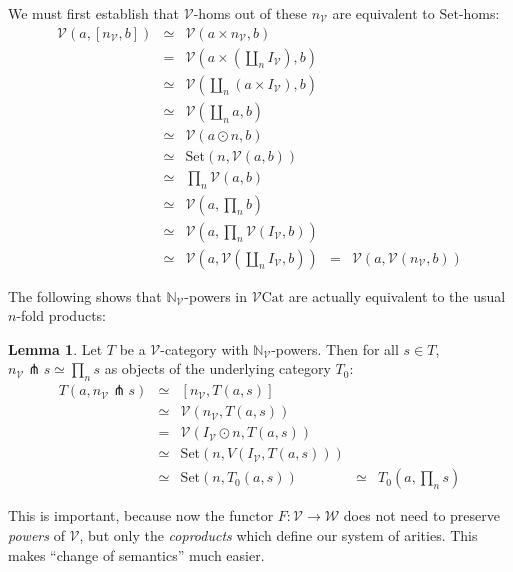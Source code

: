 \documentclass[a4paper,UKenglish]{article}
\theoremstyle{definition}
\newtheorem{lemma}[theorem]{Lemma}
\newcommand{\Set}{\mathrm{Set}}
\newcommand{\Cat}{\mathrm{Cat}}
\newcommand{\NN}{\mathbb{N}}
\newcommand{\V}{\mathscr{V}}
\newcommand{\W}{\mathscr{W}}
\newcommand{\pfk}{\pitchfork}
\begin{document}
We must first establish that $\V$-homs out of these $n_\V$ are equivalent to $\Set$-homs:
\[\begin{array}{rclcl}
	\V(a,[n_\V,b]) & \simeq & \V(a\times n_\V,b) & &\\
	& = & \V(a\times (\coprod_n I_\V),b) & &\\
	& \simeq & \V(\coprod_n(a\times I_\V),b) & &\\
	& \simeq & \V(\coprod_n a,b) & &\\
	& \simeq & \V(a\odot n,b) & &\\
	& \simeq & \Set(n,\V(a,b)) & &\\
	& \simeq & \prod_n \V(a,b) & &\\
	& \simeq & \V(a,\prod_n b) & &\\
	& \simeq & \V(a,\prod_n \V(I_\V,b)) & &\\
	& \simeq & \V(a,\V(\coprod_n I_\V,b)) & = & \V(a,\V(n_\V,b))
\end{array}\]

The following shows that $\NN_\V$-powers in $\V\Cat$ are actually equivalent to the usual $n$-fold products:

\begin{lemma}
	Let $T$ be a $\V$-category with $\NN_\V$-powers. Then for all $s \in T$, $n_\V \pfk s \simeq \prod_n s$ as objects of the underlying category $T_0$:
	\[\begin{array}{rclcl}
		T(a,n_\V \pfk s) & \simeq & [n_\V,T(a,s)] & &\\
		& \simeq & \V(n_\V,T(a,s)) & &\\
		& = & \V(I_\V \odot n,T(a,s)) & &\\
		& \simeq & \Set(n,V(I_\V,T(a,s))) & &\\
		& \simeq & \Set(n,T_0(a,s)) & \simeq & T_0(a,\prod_ns)
	\end{array}\]
\end{lemma}

This is important, because now the functor $F: \V \to \W$ does not need to preserve \textit{powers} of $\V$, but only the \textit{coproducts} which define our system of arities. This makes ``change of semantics'' much easier.

\newpage



\end{document}
